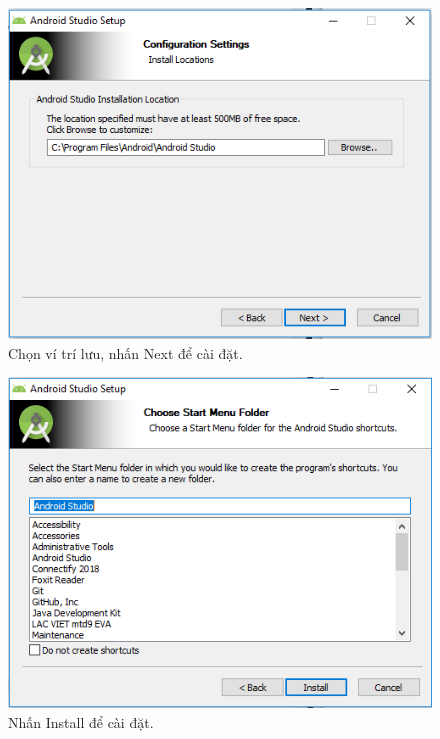 \begin{enumerate}
\begin{center}
    \begin{figure}[htp]
    \begin{center}
     \includegraphics[scale=0.6]{image3/caidat3}
    \end{center}
    \caption{Chọn ví trí lưu, nhấn Next để cài đặt.}
    \label{refhinh1}
    \end{figure}
\end{center}
\newpage
\begin{center}
    \begin{figure}[htp]
    \begin{center}
     \includegraphics[scale=0.6]{image3/caidat4}
    \end{center}
    \caption{Nhấn Install để cài đặt.}
    \label{refhinh1}
    \end{figure}
\end{center}


\end{enumerate}
